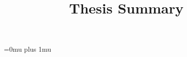 \documentclass{template/thesis.cs.pub.ro}
\begin{document}



\title{Thesis Summary}

\begin{frontmatter} %



\end{frontmatter} %



\Urlmuskip=0mu plus 1mu\relax

% 
% 

\end{document}
